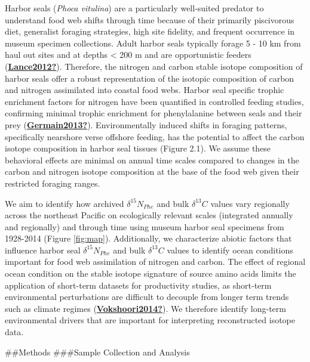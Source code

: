 \documentclass [11pt, proquest] {uwthesis}[2015/03/03]
\begin{document}
Harbor seals (\emph{Phoca vitulina}) are a particularly well-suited predator to understand food web shifts through time because of their primarily piscivorous diet, generalist foraging strategies, high site fidelity, and frequent occurrence in museum specimen collections. Adult harbor seals typically forage 5 - 10 km from haul out sites and at depths \textless{} 200 m and are opportunistic feeders (\protect\hyperlink{ref-Lance2012}{\textbf{Lance2012?}}). Therefore, the nitrogen and carbon stable isotope composition of harbor seals offer a robust representation of the isotopic composition of carbon and nitrogen assimilated into coastal food webs. Harbor seal specific trophic enrichment factors for nitrogen have been quantified in controlled feeding studies, confirming minimal trophic enrichment for phenylalanine between seals and their prey (\protect\hyperlink{ref-Germain2013}{\textbf{Germain2013?}}). Environmentally induced shifts in foraging patterns, specifically nearshore verse offshore feeding, has the potential to affect the carbon isotope composition in harbor seal tissues (Figure 2.1). We assume these behavioral effects are minimal on annual time scales compared to changes in the carbon and nitrogen isotope composition at the base of the food web given their restricted foraging ranges.

We aim to identify how archived \(\delta^{15}N_{Phe}\) and bulk \(\delta^{13}C\) values vary regionally across the northeast Pacific on ecologically relevant scales (integrated annually and regionally) and through time using museum harbor seal specimens from 1928-2014 (Figure \ref{fig:map}). Additionally, we characterize abiotic factors that influence harbor seal \(\delta^{15}N_{Phe}\) and bulk \(\delta^{13}C\) values to identify ocean conditions important for food web assimilation of nitrogen and carbon. The effect of regional ocean condition on the stable isotope signature of source amino acids limits the application of short-term datasets for productivity studies, as short-term environmental perturbations are difficult to decouple from longer term trends such as climate regimes (\protect\hyperlink{ref-Vokshoori2014}{\textbf{Vokshoori2014?}}). We therefore identify long-term environmental drivers that are important for interpreting reconstructed isotope data.

\#\#Methods
\#\#\#Sample Collection and Analysis
\end{document}

